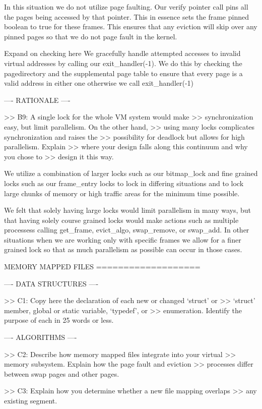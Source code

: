 In this situation we do not utilize page faulting. Our verify pointer call
pins all the pages being accessed by that pointer. This in essence sets the
frame pinned boolean to true for these frames. This ensures that any eviction
will skip over any pinned pages so that we do not page fault in the kernel.

Expand on checking here
We gracefully handle attempted accesses to invalid virtual addresses by
calling our exit_handler(-1). We do this by checking the pagedirectory
and the supplemental page table to ensure that every page is a valid
address in either one otherwise we call exit_handler(-1)


---- RATIONALE ----

>> B9: A single lock for the whole VM system would make
>> synchronization easy, but limit parallelism.  On the other hand,
>> using many locks complicates synchronization and raises the
>> possibility for deadlock but allows for high parallelism.  Explain
>> where your design falls along this continuum and why you chose to
>> design it this way.

We utilize a combination of larger locks such as our bitmap_lock and
fine grained locks such as our frame_entry locks to lock in differing
situations and to lock large chunks of memory or high traffic areas 
for the minimum time possible. 

We felt that solely having large locks would limit parallelism in many ways, 
but that having solely course grained locks would make actions such as multiple
processess calling get_frame, evict_algo, swap_remove, or swap_add. In other
situations when we are working only with specific frames we allow for a finer
grained lock so that as much parallelism as possible can occur in those cases.

             MEMORY MAPPED FILES
             ===================

---- DATA STRUCTURES ----

>> C1: Copy here the declaration of each new or changed `struct' or
>> `struct' member, global or static variable, `typedef', or
>> enumeration.  Identify the purpose of each in 25 words or less.

---- ALGORITHMS ----

>> C2: Describe how memory mapped files integrate into your virtual
>> memory subsystem.  Explain how the page fault and eviction
>> processes differ between swap pages and other pages.

>> C3: Explain how you determine whether a new file mapping overlaps
>> any existing segment.

